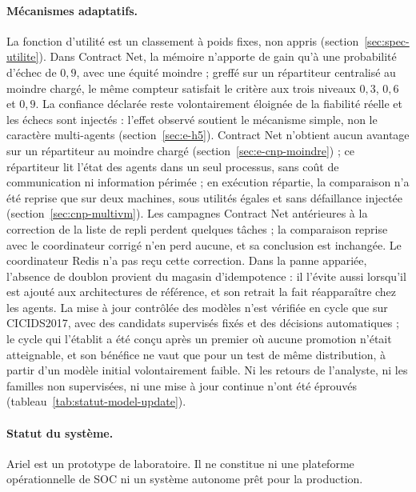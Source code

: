 \paragraph{Mécanismes adaptatifs.}
La fonction d'utilité est un classement à poids fixes, non appris
(section~\ref{sec:spec-utilite}). Dans Contract Net, la mémoire n'apporte de gain qu'à une probabilité d'échec
de $0{,}9$, avec une équité moindre ; greffé sur un répartiteur centralisé au moindre chargé,
le même compteur satisfait le critère aux trois niveaux $0{,}3$, $0{,}6$ et $0{,}9$.
La confiance déclarée reste volontairement éloignée de la fiabilité réelle et les échecs sont
injectés : l'effet observé soutient le mécanisme simple, non le caractère multi-agents
(section~\ref{sec:e-h5}). Contract Net
n'obtient aucun avantage sur un répartiteur au moindre chargé
(section~\ref{sec:e-cnp-moindre}) ; ce répartiteur lit l'état des agents dans un seul
processus, sans coût de communication ni information périmée ; en exécution répartie, la
comparaison n'a été reprise que sur deux machines, sous utilités égales et sans défaillance
injectée (section~\ref{sec:cnp-multivm}). Les campagnes Contract Net antérieures à la correction de la liste de repli perdent
quelques tâches ; la comparaison reprise avec le coordinateur corrigé n'en perd aucune, et sa
conclusion est inchangée. Le coordinateur Redis n'a pas reçu cette correction. Dans la panne appariée, l'absence
de doublon provient du magasin d'idempotence : il l'évite aussi lorsqu'il est ajouté aux
architectures de référence, et son retrait la fait réapparaître chez les agents. La mise à jour contrôlée des modèles n'est vérifiée en
cycle que sur CICIDS2017, avec des candidats supervisés fixés et des décisions automatiques ;
le cycle qui l'établit a été conçu après un premier où aucune promotion n'était atteignable,
et son bénéfice ne vaut que pour un test de même distribution, à partir d'un modèle
initial volontairement faible. Ni les retours de l'analyste, ni les familles non
supervisées, ni une mise à jour continue n'ont été éprouvés
(tableau~\ref{tab:statut-model-update}).

\paragraph{Statut du système.}
Ariel \logminer{} est un prototype de laboratoire. Il ne constitue ni une plateforme
opérationnelle de SOC ni un système autonome prêt pour la production.
